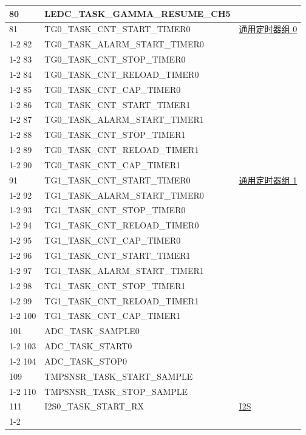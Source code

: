 \documentclass[main\_\_CN.tex]{subfiles}
\begin{document}
\begin{longtable}{ | l | l | l | }
80  & LEDC\_TASK\_GAMMA\_RESUME\_CH5& \\ \hline
81  & TG0\_TASK\_CNT\_START\_TIMER0     & \hyperref[mod:timg]{通用定时器组 0}\\ \cline{1-2}
82  & TG0\_TASK\_ALARM\_START\_TIMER0   & \\ \cline{1-2}
83  & TG0\_TASK\_CNT\_STOP\_TIMER0      & \\ \cline{1-2}
84  & TG0\_TASK\_CNT\_RELOAD\_TIMER0    & \\ \cline{1-2}
85  & TG0\_TASK\_CNT\_CAP\_TIMER0       & \\ \cline{1-2}
86  & TG0\_TASK\_CNT\_START\_TIMER1     & \\ \cline{1-2}
87  & TG0\_TASK\_ALARM\_START\_TIMER1   & \\ \cline{1-2}
88 & TG0\_TASK\_CNT\_STOP\_TIMER1      & \\ \cline{1-2}
89 & TG0\_TASK\_CNT\_RELOAD\_TIMER1    & \\ \cline{1-2}
90 & TG0\_TASK\_CNT\_CAP\_TIMER1       & \\ \hline
91 & TG1\_TASK\_CNT\_START\_TIMER0     & \hyperref[mod:timg]{通用定时器组 1}\\ \cline{1-2}
92 & TG1\_TASK\_ALARM\_START\_TIMER0   & \\ \cline{1-2}
93 & TG1\_TASK\_CNT\_STOP\_TIMER0      & \\ \cline{1-2}
94 & TG1\_TASK\_CNT\_RELOAD\_TIMER0    & \\ \cline{1-2}
95 & TG1\_TASK\_CNT\_CAP\_TIMER0       & \\ \cline{1-2}
96 & TG1\_TASK\_CNT\_START\_TIMER1     & \\ \cline{1-2}
97 & TG1\_TASK\_ALARM\_START\_TIMER1   & \\ \cline{1-2}
98 & TG1\_TASK\_CNT\_STOP\_TIMER1      & \\ \cline{1-2}
99 & TG1\_TASK\_CNT\_RELOAD\_TIMER1    & \\ \cline{1-2}
100 & TG1\_TASK\_CNT\_CAP\_TIMER1       & \\ \hline
101 & ADC\_TASK\_SAMPLE0     & \nameref{mod:adc}   \\ \cline{1-2}
103 & ADC\_TASK\_START0      & \\ \cline{1-2}
104 & ADC\_TASK\_STOP0& \\ \hline
109 & TMPSNSR\_TASK\_START\_SAMPLE  & \nameref{mod:tmpsen}      \\ \cline{1-2}
110 & TMPSNSR\_TASK\_STOP\_SAMPLE   & \\ \hline
111 & I2S0\_TASK\_START\_RX   & \hyperref[mod:i2s]{I2S}   \\ \cline{1-2}

\end{longtable}
\end{document}
